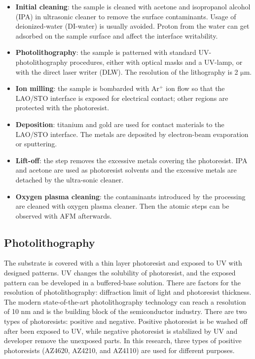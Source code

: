 \documentclass[pdflatex, sectionletters, 12pt, final, phd]{pittetd}    %
\begin{document}
\begin{itemize}
	
	\item \textbf{Initial cleaning}: the sample is cleaned with acetone and isopropanol alcohol (IPA) in ultrasonic cleaner to remove the surface contaminants. Usage of deionized-water (DI-water) is usually avoided. Proton from the water can get adsorbed on the sample surface and affect the interface writability\cite{xie2011control, brown2016giant, bi2010water}.
	
	\item \textbf{Photolithography}: the sample is patterned with standard UV-photolithography procedures, either with optical masks and a UV-lamp, or with the direct laser writer (DLW). The resolution of the lithography is 2 $\mathrm{\mu}$m.
	
	\item \textbf{Ion milling}: the sample is bombarded with Ar$^+$ ion flow so that the LAO/STO interface is exposed for electrical contact; other regions are protected with the photoresist.
	
	\item \textbf{Deposition}: titanium and gold are used for contact materials to the LAO/STO interface. The metals are deposited by electron-beam evaporation or sputtering.
	
	\item \textbf{Lift-off}: the step removes the excessive metals covering the photoresist. IPA and acetone are used as photoresist solvents and the excessive metals are detached by the ultra-sonic cleaner.
	
	\item \textbf{Oxygen plasma cleaning}: the contaminants introduced by the processing are cleaned with oxygen plasma cleaner. Then the atomic steps can be observed with AFM afterwards.
	
\end{itemize}

\subsection{Photolithography}
\label{SEC:Photolithography}

The substrate is covered with a thin layer photoresist and exposed to UV with designed patterns. UV changes the solubility of photoresist, and the exposed pattern can be developed in a buffered-base solution. There are factors for the resolution of photolithography: diffraction limit of light and photoresist thickness. The modern state-of-the-art photolithography technology can reach a resolution of 10 nm and is the building block of the semiconductor industry. There are two types of photoresists: positive and negative. Positive photoresist is be washed off after been exposed to UV, while negative photoresist is stabilized by UV and developer remove the unexposed parts. In this research, three types of positive photoresists (AZ4620, AZ4210, and AZ4110) are used for different purposes. 
\end{document}

